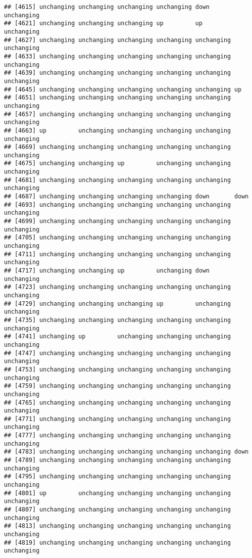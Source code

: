 \documentclass[]{article}
\begin{document}
\begin{verbatim}
## [4615] unchanging unchanging unchanging unchanging down       unchanging
## [4621] unchanging unchanging unchanging up         up         unchanging
## [4627] unchanging unchanging unchanging unchanging unchanging unchanging
## [4633] unchanging unchanging unchanging unchanging unchanging unchanging
## [4639] unchanging unchanging unchanging unchanging unchanging unchanging
## [4645] unchanging unchanging unchanging unchanging unchanging up        
## [4651] unchanging unchanging unchanging unchanging unchanging unchanging
## [4657] unchanging unchanging unchanging unchanging unchanging unchanging
## [4663] up         unchanging unchanging unchanging unchanging unchanging
## [4669] unchanging unchanging unchanging unchanging unchanging unchanging
## [4675] unchanging unchanging up         unchanging unchanging unchanging
## [4681] unchanging unchanging unchanging unchanging unchanging unchanging
## [4687] unchanging unchanging unchanging unchanging down       down      
## [4693] unchanging unchanging unchanging unchanging unchanging unchanging
## [4699] unchanging unchanging unchanging unchanging unchanging unchanging
## [4705] unchanging unchanging unchanging unchanging unchanging unchanging
## [4711] unchanging unchanging unchanging unchanging unchanging unchanging
## [4717] unchanging unchanging up         unchanging down       unchanging
## [4723] unchanging unchanging unchanging unchanging unchanging unchanging
## [4729] unchanging unchanging unchanging up         unchanging unchanging
## [4735] unchanging unchanging unchanging unchanging unchanging unchanging
## [4741] unchanging up         unchanging unchanging unchanging unchanging
## [4747] unchanging unchanging unchanging unchanging unchanging unchanging
## [4753] unchanging unchanging unchanging unchanging unchanging unchanging
## [4759] unchanging unchanging unchanging unchanging unchanging unchanging
## [4765] unchanging unchanging unchanging unchanging unchanging unchanging
## [4771] unchanging unchanging unchanging unchanging unchanging unchanging
## [4777] unchanging unchanging unchanging unchanging unchanging unchanging
## [4783] unchanging unchanging unchanging unchanging unchanging down      
## [4789] unchanging unchanging unchanging unchanging unchanging unchanging
## [4795] unchanging unchanging unchanging unchanging unchanging unchanging
## [4801] up         unchanging unchanging unchanging unchanging unchanging
## [4807] unchanging unchanging unchanging unchanging unchanging unchanging
## [4813] unchanging unchanging unchanging unchanging unchanging unchanging
## [4819] unchanging unchanging unchanging unchanging unchanging unchanging

\end{verbatim}
\end{document}
